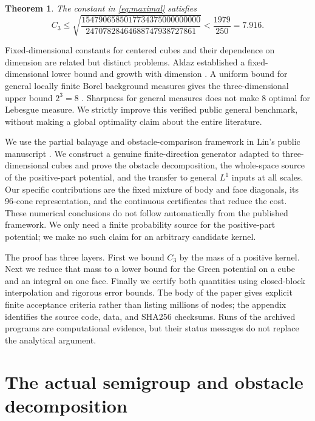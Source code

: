 \documentclass[11pt,a4paper]{article}
\newtheorem{theorem}{Theorem}[section]
\theoremstyle{definition}\newtheorem{definition}[theorem]{Definition}
\theoremstyle{remark}\newtheorem{remark}[theorem]{Remark}
\begin{document}
\begin{theorem}\label{thm:main}
The constant in \eqref{eq:maximal} satisfies
\begin{equation}\label{eq:bound}
 C_3\le \sqrt{\frac{1547906585017734375000000000}
 {24707828464688747938727861}}<\frac{1979}{250}=7.916.
\end{equation}
\end{theorem}

Fixed-dimensional constants for centered cubes and their dependence on dimension are related but distinct problems. Aldaz established a fixed-dimensional lower bound and growth with dimension \cite{Aldaz2000,Aldaz2011}. A uniform bound for general locally finite Borel background measures gives the three-dimensional upper bound $2^3=8$ \cite{AldazKissing2020}. Sharpness for general measures does not make $8$ optimal for Lebesgue measure. We strictly improve this verified public general benchmark, without making a global optimality claim about the entire literature.

We use the partial balayage and obstacle-comparison framework in Lin's public manuscript \cite{Lin}. We construct a genuine finite-direction generator adapted to three-dimensional cubes and prove the obstacle decomposition, the whole-space source of the positive-part potential, and the transfer to general $L^1$ inputs at all scales. Our specific contributions are the fixed mixture of body and face diagonals, its 96-cone representation, and the continuous certificates that reduce the cost. These numerical conclusions do not follow automatically from the published framework. We only need a finite probability source for the positive-part potential; we make no such claim for an arbitrary candidate kernel.

The proof has three layers. First we bound $C_3$ by the mass of a positive kernel. Next we reduce that mass to a lower bound for the Green potential on a cube and an integral on one face. Finally we certify both quantities using closed-block interpolation and rigorous error bounds. The body of the paper gives explicit finite acceptance criteria rather than listing millions of nodes; the appendix identifies the source code, data, and SHA256 checksums. Runs of the archived programs are computational evidence, but their status messages do not replace the analytical argument.

\section{The actual semigroup and obstacle decomposition}
\end{document}
